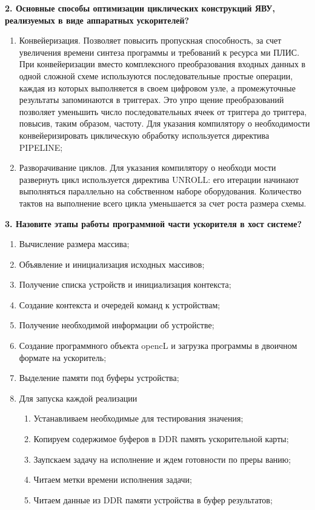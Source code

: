 \textbf{2. Основные способы оптимизации циклических конструкций ЯВУ, реализуемых в виде аппаратных ускорителей?}

\begin{enumerate}
	\item Конвейеризация. Позволяет повысить пропускная способность, за
	счет увеличения времени синтеза программы и требований к ресурса­
	ми ПЛИС. При конвейеризации вместо комплексного преобразования
	входных данных в одной сложной схеме используются последовательные
	простые операции, каждая из которых выполняется в своем цифровом
	узле, а промежуточные результаты запоминаются в триггерах. Это упро­
	щение преобразований позволяет уменьшить число последовательных
	ячеек от триггера до триггера, повысив, таким образом, частоту. Для
	указания компилятору о необходимости конвейеризировать циклическую
	обработку используется директива PIPELINE;
	\item Разворачивание циклов. Для указания компилятору о необходи­
	мости развернуть цикл используется директива UNROLL: его итерации
	начинают выполняться параллельно на собственном наборе оборудования.
	Количество тактов на выполнение всего цикла уменьшается за счет роста
	размера схемы.
\end{enumerate}

\textbf{3. Назовите этапы работы программной части ускорителя в хост системе?}
\begin{enumerate} 
	\item Вычисление размера массива; 
	\item Объявление и инициализация исходных массивов;
	\item Получение списка устройств и инициализация контекста;
	\item Создание контекста и очередей команд к устройствам;
	\item Получение необходимой информации об устройстве;
	\item Создание программного объекта opencL и загрузка программы в
	двоичном формате на ускоритель;
	\item Выделение памяти под буферы устройства;
	\item Для запуска каждой реализации
	\begin{enumerate} 
		\item Устанавливаем необходимые для тестирования значения;
		\item Копируем содержимое буферов в DDR память ускорительной
		карты;
		\item Заупскаем задачу на исполнение и ждем готовности по преры­
		ванию;
		\item Читаем метки времени исполнения задачи;
		\item Читаем данные из DDR памяти устройства в буфер результатов;
	\end{enumerate}
\end{enumerate}


